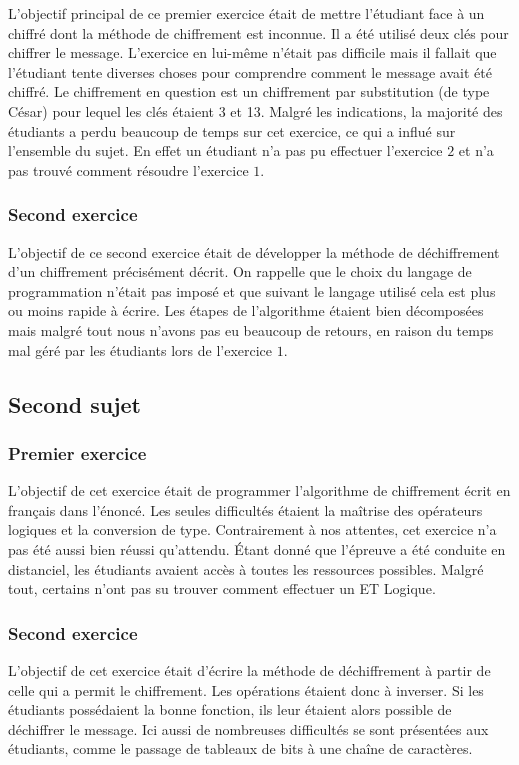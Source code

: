 \documentclass[12pt]{article}
\begin{document}

L'objectif principal de ce premier exercice était de mettre l'étudiant face à un chiffré dont la méthode de chiffrement est inconnue. Il a été utilisé deux clés pour chiffrer le message. L'exercice en lui-même n'était pas difficile mais il fallait que l'étudiant tente diverses choses pour comprendre comment le message avait été chiffré. Le chiffrement en question est un chiffrement par substitution (de type César) pour lequel les clés étaient \textsf{3} et \textsf{13}. Malgré les indications, la majorité des étudiants a perdu beaucoup de temps sur cet exercice, ce qui a influé sur l'ensemble du sujet. En effet un étudiant n'a pas pu effectuer l'exercice $2$ et n'a pas trouvé comment résoudre l'exercice $1$.


\subsubsection{Second exercice}

L'objectif de ce second exercice était de développer la méthode de déchiffrement d'un chiffrement précisément décrit. On rappelle que le choix du langage de programmation n'était pas imposé et que suivant le langage utilisé cela est plus ou moins rapide à écrire. Les étapes de l'algorithme étaient bien décomposées mais malgré tout nous n'avons pas eu beaucoup de retours, en raison du temps mal géré par les étudiants lors de l'exercice $1$.

\pagebreak

\subsection{Second sujet}
\subsubsection{Premier exercice}
L'objectif de cet exercice était de programmer l'algorithme de chiffrement écrit en français dans l'énoncé. Les seules difficultés étaient la maîtrise des opérateurs logiques et la conversion de type. Contrairement à nos attentes, cet exercice n'a pas été aussi bien réussi qu'attendu. Étant donné que l'épreuve a été conduite en distanciel, les étudiants avaient accès à toutes les ressources possibles. Malgré tout, certains n'ont pas su trouver comment effectuer un \textsf{ET Logique}.

\subsubsection{Second exercice}
L'objectif de cet exercice était d'écrire la méthode de déchiffrement à partir de celle qui a permit le chiffrement. Les opérations étaient donc à inverser. Si les étudiants possédaient la bonne fonction, ils leur étaient alors possible de déchiffrer le message. Ici aussi de nombreuses difficultés se sont présentées aux étudiants, comme le passage de tableaux de bits à une chaîne de caractères.
\end{document}
